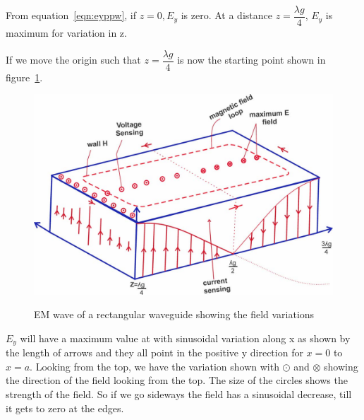 From equation~\ref{eqn:eyppw}, if $z = 0, E_{y}$ is zero. At a distance $ z = \dfrac{\lambda g}{4}$, $E_{y}$ is maximum for variation in z.

If we move the origin such that $z = \dfrac{\lambda g}{4}$ is now the starting point shown in figure~\ref{fig:lectureimage2}.
\begin{figure}[h]
\centering
\includegraphics[width=1\linewidth]{./graphics/lecture-image-2.jpg}
\label{fig:lectureimage2}
\caption{EM wave of a rectangular waveguide showing the field variations}
\end{figure}
$E_{y}$ will have a maximum value at with sinusoidal variation along x as shown by the length of arrows and they all point in the positive y direction for $x = 0$ to $x = a$. Looking from the top, we have the variation shown with $\odot$ and $\otimes$ showing the direction of the field looking from the top. The size of the circles shows the strength of the field. So if we go sideways the field has a sinusoidal decrease, till it gets to zero at the edges.
 
